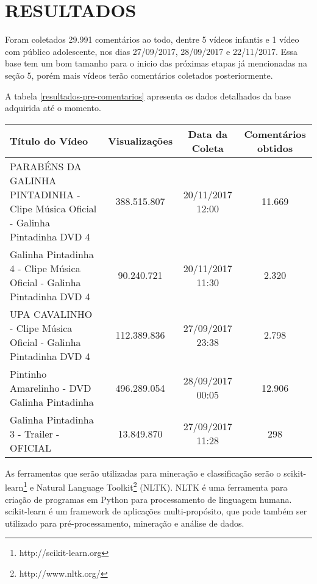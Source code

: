 \section{RESULTADOS}

Foram coletados 29.991 comentários ao todo, dentre 5 vídeos infantis e 1 vídeo com público adolescente, nos dias 27/09/2017, 28/09/2017 e 22/11/2017. Essa base tem um bom tamanho para o inicio das próximas etapas já mencionadas na seção 5, porém mais vídeos terão comentários coletados posteriormente.

A tabela \ref{resultados-pre-comentarios} apresenta os dados detalhados da base adquirida até o momento.


\begin{table}[H]
	
\begin{tabular}{|p{5.5cm}|c|c|c|}
\hline
\textbf{Título do Vídeo} & \textbf{Visualizações} & \textbf{Data da Coleta} & \textbf{Comentários obtidos} \\ \hline
PARABÉNS DA GALINHA PINTADINHA - Clipe Música Oficial - Galinha Pintadinha DVD 4 & 388.515.807 & 20/11/2017 12:00 & 11.669 \\ \hline
Galinha Pintadinha 4 - Clipe Música Oficial - Galinha Pintadinha DVD 4 & 90.240.721 & 20/11/2017 11:30 & 2.320 \\ \hline
UPA CAVALINHO - Clipe Música Oficial - Galinha Pintadinha DVD 4 & 112.389.836 & 27/09/2017 23:38 & 2.798 \\ \hline
Pintinho Amarelinho - DVD Galinha Pintadinha & 496.289.054 & 28/09/2017 00:05 & 12.906 \\ \hline
Galinha Pintadinha 3 - Trailer - OFICIAL & 13.849.870 & 27/09/2017 11:28 & 298 \\ \hline
\end{tabular}

\end{table}


As ferramentas que serão utilizadas para mineração e classificação serão o scikit-learn\footnote{http://scikit-learn.org} e Natural Language Toolkit\footnote{http://www.nltk.org/} (NLTK). NLTK é uma ferramenta para criação de programas em Python para processamento de linguagem humana. scikit-learn é um framework de aplicações multi-propósito, que pode também ser utilizado para pré-processamento, mineração e análise de dados. 

